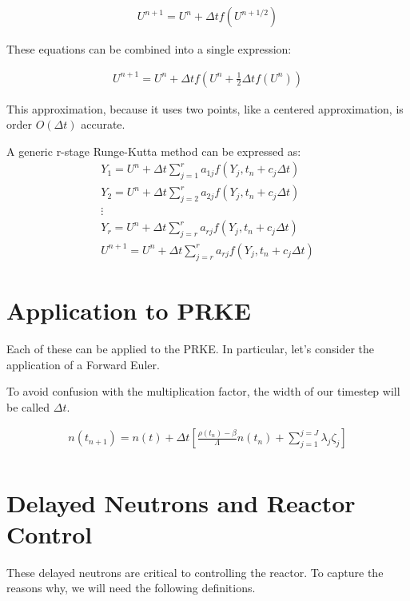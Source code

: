 \documentclass[12pt]{article}
\begin{document}
\begin{align}
U^{n+1} = U^n + \Delta tf(U^{n+1/2})
\end{align}

These equations can be combined into a single expression:

\begin{align}
U^{n+1} = U^n + \Delta tf(U^n + \frac{1}{2}\Delta tf(U^n))
\end{align}

This approximation, because it uses two points, like a centered approximation, 
is order $O(\Delta t)$ accurate.

A generic r-stage Runge-Kutta method can be expressed as:
\begin{align}
Y_1 = U^n + \Delta t\sum_{j=1}^r a_{1j}f(Y_j, t_n + c_j\Delta t)\\
Y_2 = U^n + \Delta t\sum_{j=2}^r a_{2j}f(Y_j, t_n + c_j\Delta t)\\
\vdots\nonumber\\
Y_r = U^n + \Delta t\sum_{j=r}^r a_{rj}f(Y_j, t_n + c_j\Delta t)\\
U^{n+1} = U^n + \Delta t\sum_{j=r}^r a_{rj}f(Y_j, t_n + c_j\Delta t)
\end{align}



\section{Application to PRKE}

Each of these can be applied to the PRKE. In particular, let's consider the 
application of a Forward Euler.

To avoid confusion with the multiplication factor, the width of our timestep will be called $\Delta t$.

\begin{align}
n(t_{n+1}) = n(t) + \Delta t\left[\frac{\rho(t_n)-\beta}{\Lambda}n(t_n) + \displaystyle\sum^{j=J}_{j=1}\lambda_j\zeta_j\right]\\
\end{align}

\section{Delayed Neutrons and Reactor Control}
These delayed neutrons are critical to controlling the reactor.
To capture the reasons why, we will need the following definitions.
\end{document}
